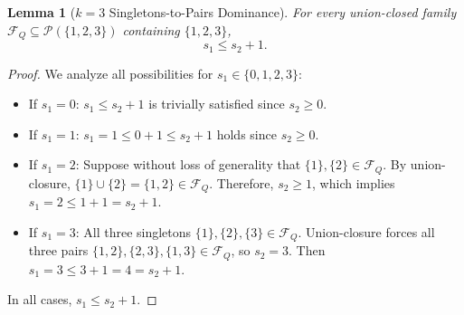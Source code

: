 \documentclass[11pt,a4paper]{article}
\theoremstyle{plain}
\newtheorem{lemma}[theorem]{Lemma}
\theoremstyle{definition}
\theoremstyle{remark}
\newcommand{\F}{\mathcal{F}}
\begin{document}
\begin{lemma}[$k=3$ Singletons-to-Pairs Dominance]\label{lem:k3_singletons}
For every union-closed family $\F_Q \subseteq \mathcal{P}(\{1, 2, 3\})$ containing $\{1, 2, 3\}$,
\begin{equation}
s_1 \le s_2 + 1.
\end{equation}
\end{lemma}
\begin{proof}
We analyze all possibilities for $s_1 \in \{0, 1, 2, 3\}$:
\begin{itemize}
    \item If $s_1 = 0$: $s_1 \le s_2 + 1$ is trivially satisfied since $s_2 \ge 0$.
    \item If $s_1 = 1$: $s_1 = 1 \le 0 + 1 \le s_2 + 1$ holds since $s_2 \ge 0$.
    \item If $s_1 = 2$: Suppose without loss of generality that $\{1\}, \{2\} \in \F_Q$. By union-closure, $\{1\} \cup \{2\} = \{1, 2\} \in \F_Q$. Therefore, $s_2 \ge 1$, which implies $s_1 = 2 \le 1 + 1 = s_2 + 1$.
    \item If $s_1 = 3$: All three singletons $\{1\}, \{2\}, \{3\} \in \F_Q$. Union-closure forces all three pairs $\{1, 2\}, \{2, 3\}, \{1, 3\} \in \F_Q$, so $s_2 = 3$. Then $s_1 = 3 \le 3 + 1 = 4 = s_2 + 1$.
\end{itemize}
In all cases, $s_1 \le s_2 + 1$.
\end{proof}
\end{document}
